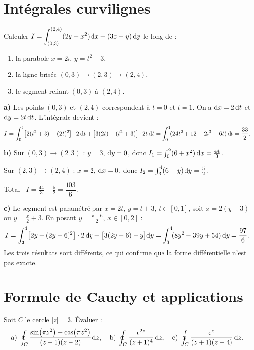 \documentclass[12pt,a4paper]{article}
\begin{document}
\section{Intégrales curvilignes}

\begin{boiteexercice}
\niveau{\facile}
Calculer $\displaystyle I = \int_{(0,3)}^{(2,4)} (2y+x^2)\,\mathrm{d} x + (3x-y)\,\mathrm{d} y$ le long de :
\begin{enumerate}[label=\alph*)]
  \item la parabole $x = 2t$, $y = t^2+3$,
  \item la ligne brisée $(0,3)\to(2,3)\to(2,4)$,
  \item le segment reliant $(0,3)$ à $(2,4)$.
\end{enumerate}
\end{boiteexercice}

\begin{boitecorrige}

\textbf{a)} Les points $(0,3)$ et $(2,4)$ correspondent à $t=0$ et $t=1$. On a $\mathrm{d} x = 2\,\mathrm{d} t$ et $\mathrm{d} y = 2t\,\mathrm{d} t$. L'intégrale devient :
\[
I = \int_0^1\bigl[2(t^2+3)+(2t)^2\bigr]\cdot 2\,\mathrm{d} t + \bigl[3(2t)-(t^2+3)\bigr]\cdot 2t\,\mathrm{d} t
= \int_0^1\!(24t^2+12-2t^3-6t)\,\mathrm{d} t = \frac{33}{2}.
\]

\textbf{b)} Sur $(0,3)\to(2,3)$ : $y=3$, $\mathrm{d} y=0$, donc $I_1 = \int_0^2(6+x^2)\,\mathrm{d} x = \tfrac{44}{3}$.

Sur $(2,3)\to(2,4)$ : $x=2$, $\mathrm{d} x=0$, donc $I_2 = \int_3^4(6-y)\,\mathrm{d} y = \tfrac{5}{2}$.

Total : $I = \tfrac{44}{3} + \tfrac{5}{2} = \dfrac{103}{6}$.

\textbf{c)} Le segment est paramétré par $x = 2t$, $y = t+3$, $t\in[0,1]$, soit $x = 2(y-3)$ ou $y = \tfrac{x}{2}+3$. En posant $y = \tfrac{x+6}{2}$, $x\in[0,2]$ :
\[
I = \int_3^4\!\left[2y+(2y-6)^2\right]\cdot 2\,\mathrm{d} y + \bigl[3(2y-6)-y\bigr]\mathrm{d} y
= \int_3^4\!(8y^2-39y+54)\,\mathrm{d} y = \frac{97}{6}.
\]
Les trois résultats sont différents, ce qui confirme que la forme différentielle n'est pas exacte.
\end{boitecorrige}

\section{Formule de Cauchy et applications}

\begin{boiteexercice}
\niveau{\moyen}
Soit $C$ le cercle $|z|=3$. Évaluer :
\[
\text{a)}\;\oint_C\frac{\sin(\pi z^2)+\cos(\pi z^2)}{(z-1)(z-2)}\,\mathrm{d} z, \quad
\text{b)}\;\oint_C\frac{\mathrm{e}^{2z}}{(z+1)^4}\,\mathrm{d} z, \quad
\text{c)}\;\oint_C\frac{\mathrm{e}^z}{(z+1)(z-4)}\,\mathrm{d} z.
\]
\end{boiteexercice}
\end{document}
